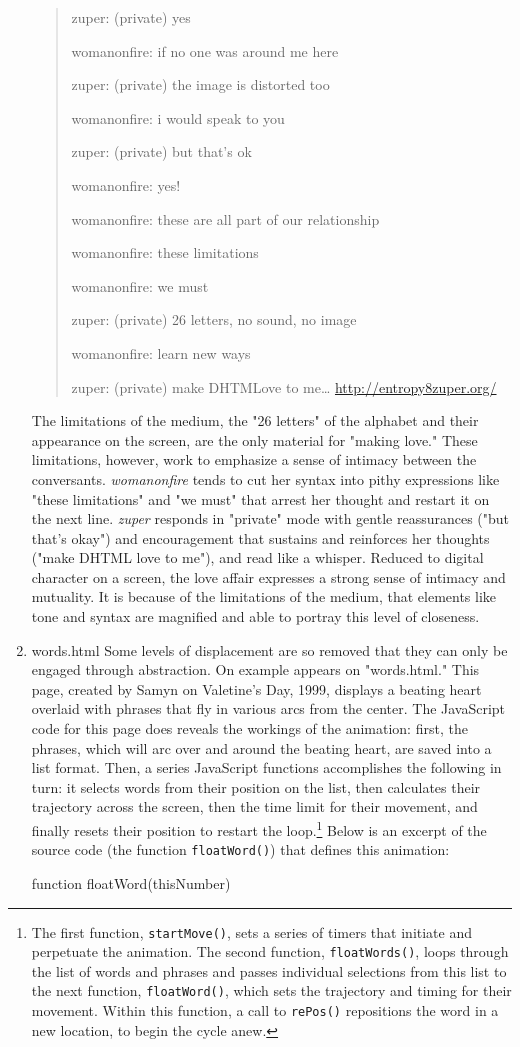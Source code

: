 \documentclass[11pt]{article}
\begin{document}
\begin{enumerate}
\begin{quote}
zuper: (private) yes

womanonfire: if no one was around me here

zuper: (private) the image is distorted too

womanonfire: i would speak to you

zuper: (private) but that's ok

womanonfire: yes!

womanonfire: these are all part of our relationship

womanonfire: these limitations

womanonfire: we must

zuper: (private) 26 letters, no sound, no image

womanonfire: learn new ways

zuper: (private) make DHTMLove to me\ldots{} \url{http://entropy8zuper.org/}
\end{quote}
The limitations of the medium, the "26 letters" of the alphabet and
their appearance on the screen, are the only material for "making
love."  These limitations, however, work to emphasize a sense of
intimacy between the conversants. \emph{womanonfire} tends to cut her
syntax into pithy expressions like "these limitations" and "we must"
that arrest her thought and restart it on the next line. \emph{zuper}
responds in "private" mode with gentle reassurances ("but that's
okay") and encouragement that sustains and reinforces her thoughts
("make DHTML love to me"), and read like a whisper. Reduced to digital
character on a screen, the love affair expresses a strong sense of
intimacy and mutuality. It is because of the limitations of the
medium, that elements like tone and syntax are magnified and able to
portray this level of closeness.

\item words.html
\label{sec:orgbbd38e9}
Some levels of displacement are so removed that they can only be
engaged through abstraction. On example appears on "words.html." This
page, created by Samyn on Valetine's Day, 1999, displays a beating
heart overlaid with phrases that fly in various arcs from the
center. The JavaScript code for this page does reveals the workings of
the animation: first, the phrases, which will arc over and around the
beating heart, are saved into a list format. Then, a series JavaScript
functions accomplishes the following in turn: it selects words from
their position on the list, then calculates their trajectory across
the screen, then the time limit for their movement, and finally resets
their position to restart the loop.\footnote{The first function, \texttt{startMove()}, sets a series of timers that
initiate and perpetuate the animation. The second function,
\texttt{floatWords()}, loops through the list of words and phrases and passes
individual selections from this list to the next function,
\texttt{floatWord()}, which sets the trajectory and timing for their
movement. Within this function, a call to \texttt{rePos()} repositions the
word in a new location, to begin the cycle anew.} Below is an excerpt of the
source code (the function \texttt{floatWord()}) that defines this animation:
\begin{SOURCE}
function floatWord(thisNumber)


\end{SOURCE}
\end{enumerate}
\end{document}
